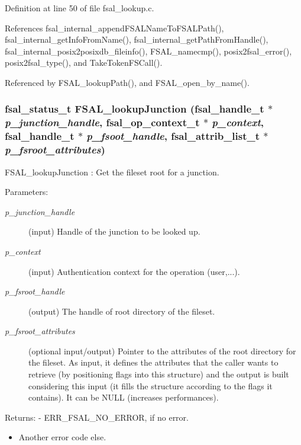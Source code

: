 Definition at line 50 of file fsal\_\-lookup.c.

References fsal\_\-internal\_\-append\-FSALName\-To\-FSALPath(), fsal\_\-internal\_\-get\-Info\-From\-Name(), fsal\_\-internal\_\-get\-Path\-From\-Handle(), fsal\_\-internal\_\-posix2posixdb\_\-fileinfo(), FSAL\_\-namecmp(), posix2fsal\_\-error(), posix2fsal\_\-type(), and Take\-Token\-FSCall().

Referenced by FSAL\_\-lookup\-Path(), and FSAL\_\-open\_\-by\_\-name().
\subsubsection{\setlength{\rightskip}{0pt plus 5cm}fsal\_\-status\_\-t FSAL\_\-lookup\-Junction (fsal\_\-handle\_\-t $\ast$ {\em p\_\-junction\_\-handle}, fsal\_\-op\_\-context\_\-t $\ast$ {\em p\_\-context}, fsal\_\-handle\_\-t $\ast$ {\em p\_\-fsoot\_\-handle}, fsal\_\-attrib\_\-list\_\-t $\ast$ {\em p\_\-fsroot\_\-attributes})}\label{fsal__lookup_8c_a2}


FSAL\_\-lookup\-Junction : Get the fileset root for a junction.

\begin{Desc}
\item[Parameters:]
\begin{description}
\item[{\em p\_\-junction\_\-handle}](input) Handle of the junction to be looked up. \item[{\em p\_\-context}](input) Authentication context for the operation (user,...). \item[{\em p\_\-fsroot\_\-handle}](output) The handle of root directory of the fileset. \item[{\em p\_\-fsroot\_\-attributes}](optional input/output) Pointer to the attributes of the root directory for the fileset. As input, it defines the attributes that the caller wants to retrieve (by positioning flags into this structure) and the output is built considering this input (it fills the structure according to the flags it contains). It can be NULL (increases performances).\end{description}
\end{Desc}
\begin{Desc}
\item[Returns:]- ERR\_\-FSAL\_\-NO\_\-ERROR, if no error.\begin{itemize}
\item Another error code else. \end{itemize}
\end{Desc}



